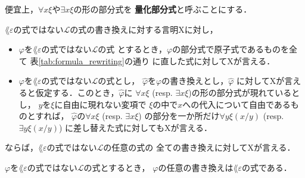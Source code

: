 	便宜上，$\forall x \xi$や$\exists x \xi$の形の部分式を
	{\bf 量化部分式}と呼ぶことにする．
	
	\begin{screen}
		\begin{metaaxm}[式の書き換えに関する構造的帰納法の原理]
		\label{metaaxm:induction_principle_of_formula_rewriting}
			$\lang{\varepsilon}$の式ではない$\mathcal{L}$の式の書き換えに対する言明Xに対し，
			\begin{itemize}
				\item $\varphi$を$\lang{\varepsilon}$の式ではない$\mathcal{L}$の式
					とするとき，$\varphi$の部分式で原子式であるものを全て
					表\ref{tab:formula_rewriting}の通り
					に直した式に対してXが言える．
					
				\item $\varphi$を$\lang{\varepsilon}$の式ではない$\mathcal{L}$の式とし，
					$\widehat{\varphi}$を$\varphi$の書き換えとし，$\widehat{\varphi}$
					に対してXが言えると仮定する．このとき，$\widehat{\varphi}$に
					$\forall x \xi$ (resp. $\exists x \xi$)の形の部分式が現れているとし，
					$y$を$\xi$に自由に現れない変項で
					$\xi$の中で$x$への代入について自由であるものとすれば，
					$\widehat{\varphi}$の$\forall x \xi$ (resp. $\exists x \xi$)
					の部分を一か所だけ$\forall y \xi(x/y)$ (resp. $\exists y \xi(x/y)$)
					に差し替えた式に対してもXが言える．
			\end{itemize}
			ならば，$\lang{\varepsilon}$の式ではない$\mathcal{L}$の任意の式の
			全ての書き換えに対してXが言える．
		\end{metaaxm}
	\end{screen}
	
	\begin{screen}
		\begin{metathm}
		\label{metathm:rewritten_formulas_are_of_L_epsilon}
			$\varphi$を$\lang{\varepsilon}$の式ではない$\mathcal{L}$の式とするとき，
			$\varphi$の任意の書き換えは$\lang{\varepsilon}$の式である．
		\end{metathm}
	\end{screen}
	
